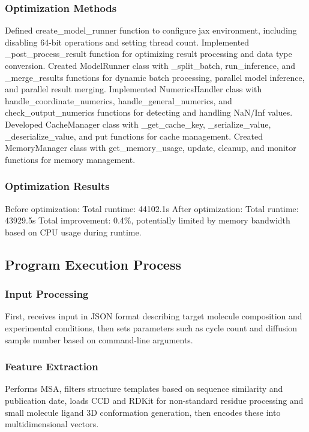 \documentclass[a4paper,12pt]{article}
\begin{document}
\subsubsection{Optimization Methods}
Defined create\_model\_runner function to configure jax environment, including disabling 64-bit operations and setting thread count. Implemented \_post\_process\_result function for optimizing result processing and data type conversion. Created ModelRunner class with \_split\_batch, run\_inference, and \_merge\_results functions for dynamic batch processing, parallel model inference, and parallel result merging. Implemented NumericsHandler class with handle\_coordinate\_numerics, handle\_general\_numerics, and check\_output\_numerics functions for detecting and handling NaN/Inf values. Developed CacheManager class with \_get\_cache\_key, \_serialize\_value, \_deserialize\_value, and put functions for cache management. Created MemoryManager class with get\_memory\_usage, update, cleanup, and monitor functions for memory management.

\subsubsection{Optimization Results}
Before optimization: Total runtime: 44102.1s
After optimization: Total runtime: 43929.5s
Total improvement: 0.4\%, potentially limited by memory bandwidth based on CPU usage during runtime.

\subsection{Program Execution Process}

\subsubsection{Input Processing}
First, receives input in JSON format describing target molecule composition and experimental conditions, then sets parameters such as cycle count and diffusion sample number based on command-line arguments.

\subsubsection{Feature Extraction}
Performs MSA, filters structure templates based on sequence similarity and publication date, loads CCD and RDKit for non-standard residue processing and small molecule ligand 3D conformation generation, then encodes these into multidimensional vectors.
\end{document}
